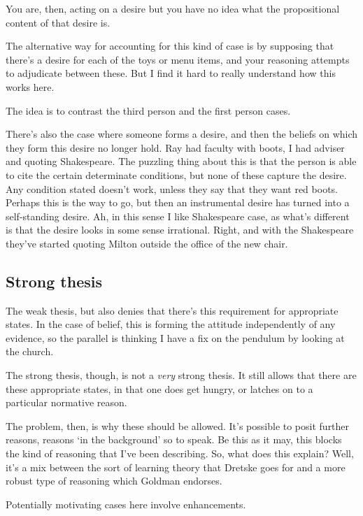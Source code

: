 \documentclass[10pt]{article}
\begin{document}
You are, then, acting on a desire but you have no idea what the propositional content of that desire is.

The alternative way for accounting for this kind of case is by supposing that there's a desire for each of the toys or menu items, and your reasoning attempts to adjudicate between these.
But I find it hard to really understand how this works here.

The idea is to contrast the third person and the first person cases.

There's also the case where someone forms a desire, and then the beliefs on which they form this desire no longer hold.
Ray had faculty with boots, I had adviser and quoting Shakespeare.
The puzzling thing about this is that the person is able to cite the certain determinate conditions, but none of these capture the desire.
Any condition stated doesn't work, unless they say that they want red boots.
Perhaps this is the way to go, but then an instrumental desire has turned into a self-standing desire.
Ah, in this sense I like Shakespeare case, as what's different is that the desire looks in some sense irrational.
Right, and with the Shakespeare they've started quoting Milton outside the office of the new chair.

\subsection{Strong thesis}
\label{sec:strong-thesis}


The weak thesis, but also denies that there's this requirement for appropriate states.
In the case of belief, this is forming the attitude independently of any evidence, so the parallel is thinking I have a fix on the pendulum by looking at the church.

The strong thesis, though, is not a \emph{very} strong thesis.
It still allows that there are these appropriate states, in that one does get hungry, or latches on to a particular normative reason.

The problem, then, is why these should be allowed.
It's possible to posit further reasons, reasons `in the background' so to speak.
Be this as it may, this blocks the kind of reasoning that I've been describing.
So, what does this explain?
Well, it's a mix between the sort of learning theory that Dretske goes for and a more robust type of reasoning which Goldman endorses.

Potentially motivating cases here involve enhancements.
\end{document}
